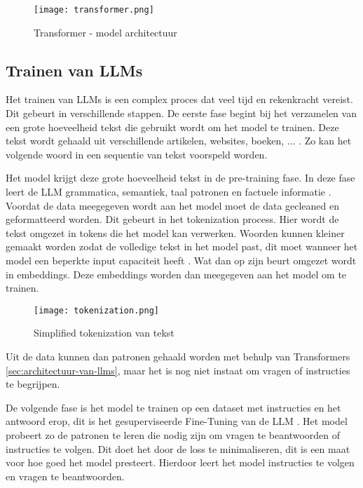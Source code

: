 \begin{figure}[h]
  \centering
  \texttt{[image: transformer.png]}
  \caption{Transformer - model architectuur \autocite{VaswaniEtAl2017}}
  \label{fig:transformer-model}
\end{figure}

\subsection{Trainen van LLMs}
\label{sec:trainen-van-llms}
Het trainen van LLMs is een complex proces dat veel tijd en rekenkracht vereist. Dit gebeurt in verschillende stappen.
De eerste fase begint bij het verzamelen van een grote hoeveelheid tekst die gebruikt wordt om het model te trainen.
Deze tekst wordt gehaald uit verschillende artikelen, websites, boeken, ... . Zo kan het volgende woord in een sequentie van tekst voorspeld worden.

Het model krijgt deze grote hoeveelheid tekst in de pre-training fase.
In deze fase leert de LLM grammatica, semantiek, taal patronen en factuele informatie \autocite{Cacic2023}.
Voordat de data meegegeven wordt aan het model moet de data gecleaned en geformatteerd worden.
Dit gebeurt in het tokenization process. Hier wordt de tekst omgezet in tokens die het model kan verwerken.
Woorden kunnen kleiner gemaakt worden zodat de volledige tekst in het model past, dit moet wanneer het model een beperkte input capaciteit heeft \autocite{ElHousieny2023}.
Wat dan op zijn beurt omgezet wordt in embeddings. Deze embeddings worden dan meegegeven aan het model om te trainen.
\begin{figure}[h]
  \centering
  \texttt{[image: tokenization.png]}
  \caption{Simplified tokenization van tekst \autocite{TeeTracker2023}}
  \label{fig:tokenization}
\end{figure}
Uit de data kunnen dan patronen gehaald worden met behulp van Transformers \ref{sec:architectuur-van-llms}, maar het is nog niet instaat om vragen of instructies te begrijpen.

De volgende fase is het model te trainen op een dataset met instructies en het antwoord erop, dit is het gesuperviseerde Fine-Tuning van de LLM \autocite{Das2024}. 
Het model probeert zo de patronen te leren die nodig zijn om vragen te beantwoorden of instructies te volgen.
Dit doet het door de loss te minimaliseren, dit is een maat voor hoe goed het model presteert.
Hierdoor leert het model instructies te volgen en vragen te beantwoorden.

